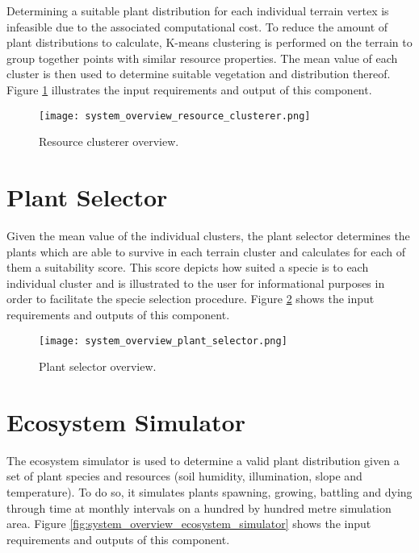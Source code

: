 Determining a suitable plant distribution for each individual terrain vertex is infeasible due to the associated computational cost. To reduce the amount of plant distributions to calculate, K-means clustering is performed on the terrain to group together points with similar resource properties. The mean value of each cluster is then used to determine suitable vegetation and distribution thereof. Figure \ref{fig:system_overview_resoure_clusterer} illustrates the input requirements and output of this component.

\begin{figure}
\center
	\texttt{[image: system\_overview\_resource\_clusterer.png]}
	\caption{ Resource clusterer overview.}	
	\label{fig:system_overview_resoure_clusterer}
\end{figure}

\section{Plant Selector}

Given the mean value of the individual clusters, the plant selector determines the plants which are able to survive in each terrain cluster and calculates for each of them a suitability score. This score depicts how suited a specie is to each individual cluster and is illustrated to the user for informational purposes in order to facilitate the specie selection procedure. Figure \ref{fig:system_overview_plant_selector} shows the input requirements and outputs of this component.

\begin{figure}
\center
	\texttt{[image: system\_overview\_plant\_selector.png]}
	\caption{ Plant selector overview.}	
	\label{fig:system_overview_plant_selector}
\end{figure}

\section{Ecosystem Simulator}

The ecosystem simulator is used to determine a valid plant distribution given a set of plant species and resources (soil humidity, illumination, slope and temperature). To do so, it simulates plants spawning, growing, battling and dying through time at monthly intervals on a hundred by hundred metre simulation area. Figure \ref{fig:system_overview_ecosystem_simulator} shows the input requirements and outputs of this component.

